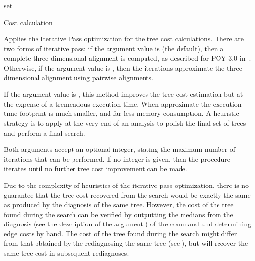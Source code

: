 \begin{command}{set}{}
\begin{arguments}
\begin{argumentgroup}{Cost calculation}
                {Applies the Iterative Pass optimization for the tree cost
                calculations. There are two forms of iterative pass: if the
                argument value is  (the default), then a complete three
                dimensional alignment is computed, as described for POY 3.0 in~\cite{wheeler2003a}. 
                Otherwise, if the argument value is , then the iterations
                approximate the three dimensional alignment using pairwise
                alignments. 

                If the argument value is , this method improves the tree
                cost estimation but at the expense of a tremendous execution
                time. When approximate the execution time footprint is much
                smaller, and far less memory consumption.
                A heuristic strategy is to apply   at the 
                very end of an analysis to polish the final set of trees and perform a final search. 
                
                Both arguments accept an optional integer, stating the maximum
                number of iterations that can be performed. If no integer is
                given, then the procedure iterates until no further tree cost
                improvement can be made.}
                {}
                
	\begin{statement}
  	  Due to the complexity of heuristics of the iterative pass optimization, there is no
	  guarantee that the tree cost recovered from the search would be exactly the same
	  as produced by the diagnosis of the same tree. However, the cost of the tree found during
	  the search can be verified by outputting the medians from the diagnosis
      (see the description of the argument )
      of the command  and determining edge costs by hand. The cost of the tree found during the search might
	  differ from that obtained by the rediagnosing the same tree (see ), but will
	  recover the same tree cost in subsequent rediagnoses.


\end{statement}
\end{argumentgroup}
\end{arguments}
\end{command}
